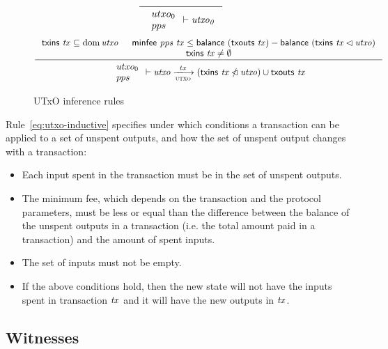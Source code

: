 \begin{figure}
  \begin{equation}\label{eq:utxo-bootstrap}
    \inference
    {
    }
    {
      {\begin{array}{l}
        utxo_0\\
        pps
      \end{array}}
      \vdash
      \var{utxo_0}
    }
  \end{equation}
  \nextdef
  \begin{equation}\label{eq:utxo-inductive}
    \inference
    { \txins{tx} \subseteq \dom \var{utxo}
      & \minfee{pps}{tx} \leq \balance{(\txouts{tx})} - \balance{(\txins{tx} \restrictdom \var{utxo})}\\
      \txins{tx} \neq \emptyset
    }
    {
      {\begin{array}{l}
        utxo_0\\
        pps
      \end{array}}
      \vdash
      \var{utxo}
      \trans{utxo}{tx}
      (\txins{tx} \subtractdom \var{utxo}) \cup \txouts{tx}
    }
  \end{equation}
  \caption{UTxO inference rules}
  \label{fig:rules:utxo}
\end{figure}

Rule~\ref{eq:utxo-inductive} specifies under which conditions a transaction can
be applied to a set of unspent outputs, and how the set of unspent output
changes with a transaction:
\begin{itemize}
\item Each input spent in the transaction must be in the set of unspent
  outputs.
\item The minimum fee, which depends on the transaction and the protocol
  parameters, must be less or equal than the difference between the balance of
  the unspent outputs in a transaction (i.e. the total amount paid in a
  transaction) and the amount of spent inputs.
\item The set of inputs must not be empty.
\item If the above conditions hold, then the new state will not have the inputs
  spent in transaction $\mathit{tx}$ and it will have the new outputs in
  $\mathit{tx}$.
\end{itemize}

\clearpage

\subsection{Witnesses}
\label{sec:witnesses}

